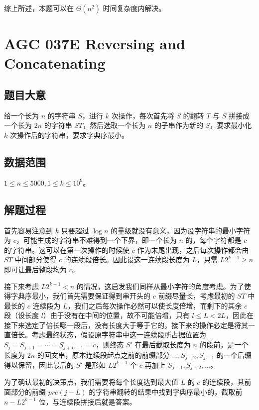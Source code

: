 \documentclass[12pt]{ctexart}
\begin{document}
综上所述，本题可以在 $\Theta(n^2)$ 时间复杂度内解决。

\newpage

\section{AGC 037E Reversing and Concatenating}

\subsection{题目大意}

给一个长为 $n$ 的字符串 $S$，进行 $k$ 次操作，每次首先将 $S$ 的翻转 $T$ 与 $S$ 拼接成一个长为 $2n$ 的字符串 $ST$，然后选取一个长为 $n$ 的子串作为新的 $S$，要求最小化 $k$ 次操作后的字符串，要求字典序最小。

\subsection{数据范围}

$1\le n\le 5000, 1\le k\le 10^9$。

\subsection{解题过程}

首先容易注意到 $k$ 只要超过 $\log n$ 的量级就没有意义，因为设字符串的最小字符为 $c$，可能生成的字符串不难得到一个下界，即一个长为 $n$ 的，每个字符都是 $c$ 的字符串。这可以在第一次操作的时候使 $c$ 作为末尾出现，之后每次操作都会由 $ST$ 中间部分使得 $c$ 的连续段倍长。因此设这一连续段长度为 $L$，只需 $L2^{k-1} \ge n$ 即可让最后整段均为 $c$。

接下来考虑 $L2^{k-1} < n$ 的情况，这启发我们同样从最小字符的角度考虑。为了使得字典序最小，我们首先需要保证得到串开头的 $c$ 前缀尽量长，考虑最初的 $ST$ 中最长的 $c$ 连续段为 $L$，我们之后每次操作必然可以使长度倍增，而剩下的其余 $c$ 段（设长度 $l$）由于没有在中间的位置，故不可能倍增，只有 $l \le L < 2L$，因此在接下来选定了倍长哪一段后，没有长度大于等于它的，接下来的操作必定是将其一直倍长。考虑最终状态，假设原字符串中这一连续段所占据位置为 $S_j = S_{j + 1} = \cdots = S_{j + L - 1} = c$，则终态 $S'$ 在最后截取长度为 $n$ 的段前，是一个长度为 $2n$ 的回文串，原本连续段起点之前的前缀部分 $\dots, S_{j-2}, S_{j-1}$ 的一个后缀得以保留，因此最后的 $S'$ 是形如 $L 2^{k-1}$ 个 $c$ 再加上 $S_{j-1}, S_{j - 2}, \dots$。

为了确认最初的决策点，我们需要将每个长度达到最大值 $L$ 的 $c$ 的连续段，其前面部分的前缀 $pre(j - L)$ 的字符串翻转的结果中找到字典序最小的，截取前 $n - L2^{k-1}$ 位，与连续段拼接后就是答案。
\end{document}
